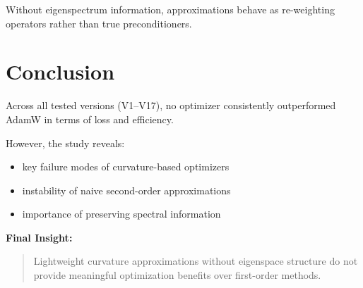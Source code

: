 \documentclass{article}
\begin{document}
Without eigenspectrum information, approximations behave as re-weighting operators rather than true preconditioners.

\section{Conclusion}

Across all tested versions (V1–V17), no optimizer consistently outperformed AdamW in terms of loss and efficiency.

However, the study reveals:

\begin{itemize}
    \item key failure modes of curvature-based optimizers
    \item instability of naive second-order approximations
    \item importance of preserving spectral information
\end{itemize}

\textbf{Final Insight:}

\begin{quote}
Lightweight curvature approximations without eigenspace structure do not provide meaningful optimization benefits over first-order methods.
\end{quote}
\end{document}
